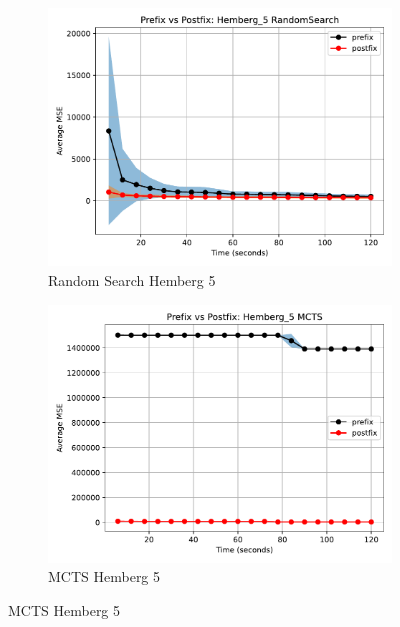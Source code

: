 \documentclass[12pt]{iopart}
\begin{document}
\begin{figure}
    \centering
    
    \begin{subfigure}[b]{0.4\textwidth}
        \includegraphics[width=\linewidth, keepaspectratio]{Hemberg_Benchmarks/PrePostHemberg_5RandomSearch.pdf}
        \caption{Random Search Hemberg 5}
        \label{subfig:hemberg_5_RS}
    \end{subfigure}
    \begin{subfigure}[b]{0.4\textwidth}
        \includegraphics[width=\linewidth, keepaspectratio]{Hemberg_Benchmarks/PrePostHemberg_5MCTS.pdf}
        \caption{MCTS Hemberg 5}
        \label{subfig:hemberg_5_MCTS}
    \end{subfigure}
    

\end{figure}
\end{document}
